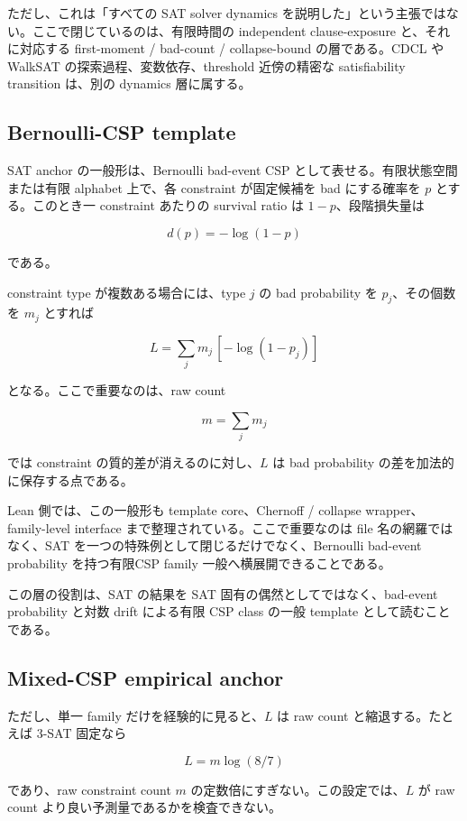 \documentclass[12pt,a4paper]{article}
\begin{document}
ただし、これは「すべての SAT solver dynamics を説明した」という主張ではない。ここで閉じているのは、有限時間の independent clause-exposure と、それに対応する first-moment / bad-count / collapse-bound の層である。CDCL や WalkSAT の探索過程、変数依存、threshold 近傍の精密な satisfiability transition は、別の dynamics 層に属する。

\subsection{Bernoulli-CSP template}\label{bernoulli-csp-template}

SAT anchor の一般形は、Bernoulli bad-event CSP として表せる。有限状態空間または有限 alphabet 上で、各 constraint が固定候補を bad にする確率を \(p\) とする。このとき一 constraint あたりの survival ratio は \(1-p\)、段階損失量は

\[
d(p)=-\log(1-p)
\]

である。

constraint type が複数ある場合には、type \(j\) の bad probability を \(p_{j}\)、その個数を \(m_{j}\) とすれば

\[
L = \sum_{j} m_{j}\,[-\log(1-p_{j})]
\]

となる。ここで重要なのは、raw count

\[
m=\sum_{j} m_{j}
\]

では constraint の質的差が消えるのに対し、\(L\) は bad probability の差を加法的に保存する点である。

Lean 側では、この一般形も template core、Chernoff / collapse wrapper、family-level interface まで整理されている。ここで重要なのは file 名の網羅ではなく、SAT を一つの特殊例として閉じるだけでなく、Bernoulli bad-event probability を持つ有限CSP family 一般へ横展開できることである。

この層の役割は、SAT の結果を SAT 固有の偶然としてではなく、bad-event probability と対数 drift による有限 CSP class の一般 template として読むことである。

\subsection{Mixed-CSP empirical anchor}\label{mixed-csp-empirical-anchor}

ただし、単一 family だけを経験的に見ると、\(L\) は raw count と縮退する。たとえば 3-SAT 固定なら

\[
L=m\log(8/7)
\]

であり、raw constraint count \(m\) の定数倍にすぎない。この設定では、\(L\) が raw count より良い予測量であるかを検査できない。
\end{document}
